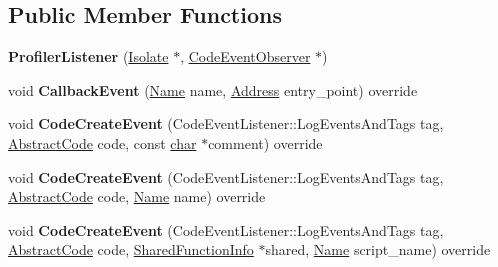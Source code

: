 \subsection*{Public Member Functions}
\begin{DoxyCompactItemize}
\item 
\mbox{\label{classv8_1_1internal_1_1ProfilerListener_a2147e5b887e41ec33e129840174ee425}} 
{\bfseries Profiler\+Listener} (\mbox{\hyperlink{classv8_1_1internal_1_1Isolate}{Isolate}} $\ast$, \mbox{\hyperlink{classv8_1_1internal_1_1CodeEventObserver}{Code\+Event\+Observer}} $\ast$)
\item 
\mbox{\label{classv8_1_1internal_1_1ProfilerListener_a65b2b92fd53688e27828c294e557e510}} 
void {\bfseries Callback\+Event} (\mbox{\hyperlink{classv8_1_1internal_1_1Name}{Name}} name, \mbox{\hyperlink{classuintptr__t}{Address}} entry\+\_\+point) override
\item 
\mbox{\label{classv8_1_1internal_1_1ProfilerListener_a25ccd944c83ad98d8ec1604bfdfb2c7a}} 
void {\bfseries Code\+Create\+Event} (Code\+Event\+Listener\+::\+Log\+Events\+And\+Tags tag, \mbox{\hyperlink{classv8_1_1internal_1_1AbstractCode}{Abstract\+Code}} code, const \mbox{\hyperlink{classchar}{char}} $\ast$comment) override
\item 
\mbox{\label{classv8_1_1internal_1_1ProfilerListener_a6fb8651b91b7799809291936a4fc3104}} 
void {\bfseries Code\+Create\+Event} (Code\+Event\+Listener\+::\+Log\+Events\+And\+Tags tag, \mbox{\hyperlink{classv8_1_1internal_1_1AbstractCode}{Abstract\+Code}} code, \mbox{\hyperlink{classv8_1_1internal_1_1Name}{Name}} name) override
\item 
\mbox{\label{classv8_1_1internal_1_1ProfilerListener_ac4dbfc29673535104ae6d2a7b2ff1ea5}} 
void {\bfseries Code\+Create\+Event} (Code\+Event\+Listener\+::\+Log\+Events\+And\+Tags tag, \mbox{\hyperlink{classv8_1_1internal_1_1AbstractCode}{Abstract\+Code}} code, \mbox{\hyperlink{classv8_1_1internal_1_1SharedFunctionInfo}{Shared\+Function\+Info}} $\ast$shared, \mbox{\hyperlink{classv8_1_1internal_1_1Name}{Name}} script\+\_\+name) override
\item 

\end{DoxyCompactItemize}
